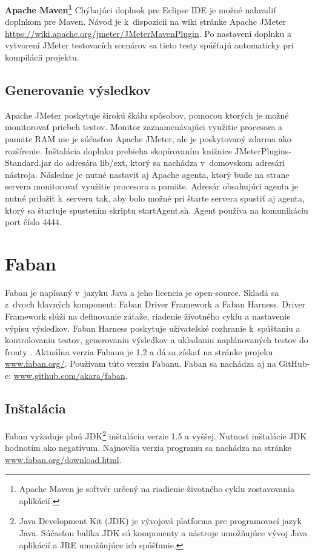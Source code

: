 \documentclass[12pt,oneside,final]{fithesis-utf8}
\begin{document}
\noindent\textbf{Apache Maven\footnote{Apache Maven je softvér určený na riadienie životného cyklu zostavovania aplikácií.}}
\newline
Chýbajúci doplnok pre Eclipse IDE je možné nahradiť doplnkom pre Maven. Návod je k~dispozícii na wiki stránke Apache JMeter \url{https://wiki.apache.org/jmeter/JMeterMavenPlugin}. Po nastavení doplnku a vytvorení JMeter testovacích scenárov sa tieto testy spúšťajú automaticky pri kompilácii projektu.

\subsection{Generovanie výsledkov}
Apache JMeter poskytuje širokú škálu spôsobov, pomocou ktorých je možné monitorovať priebeh testov. Monitor zaznamenávajúci využitie procesora a pamäte RAM nie je súčasťou Apache JMeter, ale je poskytovaný zdarma ako rozšírenie. Inštalácia doplnku prebieha skopírovaním knižnice JMeterPlugins-Standard.jar do adresára lib/ext, ktorý sa nachádza v~domovskom adresári nástroja. Následne je nutné nastaviť aj Apache agenta, ktorý bude na strane servera monitorovať využitie procesora a pamäte. Adresár obsahujúci agenta je nutné priložiť k~serveru tak, aby bolo možné pri štarte servera spustiť aj agenta, ktorý sa štartuje spustením skriptu startAgent.sh. Agent používa na komunikáciu port číslo 4444.

\newpage
\section{Faban}
Faban je napísaný v~jazyku Java a jeho licencia je open-source. Skladá sa z~dvoch hlavných komponent: Faban Driver Framework a Faban Harness. Driver Framework slúži na definovanie záťaže, riadenie životného cyklu a nastavenie výpisu výsledkov. Faban Harness poskytuje užívateľské rozhranie k~spúšťaniu a kontrolovaniu testov, generovaniu výsledkov a ukladaniu naplánovaných testov do fronty \cite{Faban}. Aktuálna verzia  Fabanu je 1.2 a dá sa získať na stránke projeku \url{www.faban.org/}. Používam túto verziu Fabanu. Faban sa nachádza aj na GitHub-e: \url{www.github.com/akara/faban}.

\subsection{Inštalácia}
Faban vyžaduje plnú JDK\footnote{Java Development Kit (JDK) je vývojová platforma pre programovací jazyk Java. Súčasťou balíka JDK sú komponenty a nástroje umožňujúce vývoj Java aplikácií a JRE umožňujúce ich spúšťanie.} inštaláciu verzie 1.5 a vyššej. Nutnosť inštalácie JDK hodnotím ako negatívum. Najnovšia verzia programu sa nachádza na stránke \url{www.faban.org/download.html}.
\end{document}
